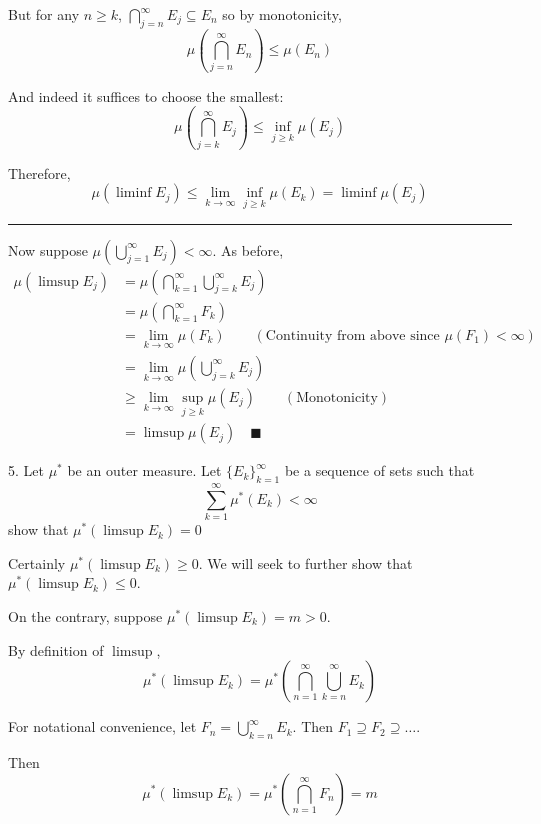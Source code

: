 \documentclass[12pt]{article}
\newcommand{\qed}{\quad \blacksquare}
\newcommand{\sub}{\subseteq}
\renewcommand{\div}{\vspace*{10pt}\hrule\vspace*{10pt}}
\begin{document}
        But for any $n \geq k$, $\bigcap_{j = n}^{\infty} E_j \sub E_n$ so by monotonicity, 
        \[\mu\left(\bigcap_{j = n}^{\infty} E_n\right) \leq \mu(E_n)\]

        And indeed it suffices to choose the smallest: 
        \[\mu\left(\bigcap_{j = k}^{\infty} E_j\right) \leq \inf_{j \geq k} \mu(E_j)\]

        Therefore, 
        \[\mu(\liminf E_j) \leq \lim_{k \to \infty} \inf_{j \geq k} \mu(E_k) = \liminf \mu(E_j)\]

        \div 

        Now suppose $\mu(\bigcup_{j=1}^{\infty} E_j) < \infty$. As before, 
        \begin{align*}
            \mu(\limsup E_j) &= \mu\left(\bigcap_{k=1}^{\infty} \bigcup_{j=k}^{\infty} E_j\right)\\ 
            &= \mu\left(\bigcap_{k=1}^{\infty} F_k\right)\\ 
            &= \lim_{k \to \infty} \mu(F_k) \qquad (\text{Continuity from above since } \mu(F_1) < \infty)\\ 
            &= \lim_{k \to \infty} \mu\left(\bigcup_{j=k}^{\infty} E_j\right)\\ 
            &\geq \lim_{k \to \infty} \sup_{j \geq k} \mu(E_j) \qquad (\text{Monotonicity})\\
            &= \limsup \mu(E_j) \qed
        \end{align*}

    \color{black}


\pagebreak

5. Let $\mu^*$ be an outer measure. Let $\{E_k\}_{k=1}^{\infty}$ be a sequence of sets such that 
\[\sum_{k=1}^\infty \mu^*(E_k) < \infty\]
show that $\mu^*(\limsup E_k) = 0$

    \color{blue}
        Certainly $\mu^*(\limsup E_k) \geq 0$. We will seek to further show that $\mu^*(\limsup E_k) \leq 0$.

        On the contrary, suppose $\mu^*(\limsup E_k) = m > 0$. 
        
        By definition of $\limsup$, 
        \[\mu^*(\limsup E_k) = \mu^*\left(\bigcap_{n=1}^{\infty} \bigcup_{k=n}^{\infty} E_k\right)\]
        
        For notational convenience, let $F_n = \bigcup_{k=n}^{\infty} E_k$. Then $F_1 \supseteq F_2 \supseteq \dots$. 
        
        Then 
        \[\mu^*(\limsup E_k) = \mu^* \left(\bigcap_{n=1}^{\infty} F_n\right) = m\]
\end{document}

